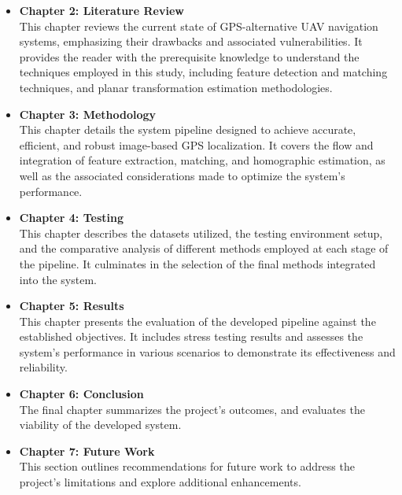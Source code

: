 \begin{itemize}
    \item \textbf{Chapter 2: Literature Review} \\
    This chapter reviews the current state of GPS-alternative UAV navigation systems, emphasizing their drawbacks and associated vulnerabilities. It provides the reader with the prerequisite knowledge to understand the techniques employed in this study, including feature detection and matching techniques, and planar transformation estimation methodologies. 
    
    \item \textbf{Chapter 3: Methodology} \\
    This chapter details the system pipeline designed to achieve accurate, efficient, and robust image-based GPS localization. It covers the flow and integration of feature extraction, matching, and homographic estimation, as well as the associated considerations made to optimize the system's performance.
    
    \item \textbf{Chapter 4: Testing} \\
    This chapter describes the datasets utilized, the testing environment setup, and the comparative analysis of different methods employed at each stage of the pipeline. It culminates in the selection of the final methods integrated into the system.
    
    \item \textbf{Chapter 5: Results} \\
    This chapter presents the evaluation of the developed pipeline against the established objectives. It includes stress testing results and assesses the system's performance in various scenarios to demonstrate its effectiveness and reliability.
    
    \item \textbf{Chapter 6: Conclusion} \\
    The final chapter summarizes the project's outcomes, and evaluates the viability of the developed system.
    
    \item \textbf{Chapter 7: Future Work} \\
    This section outlines recommendations for future work to address the project's limitations and explore additional enhancements.
\end{itemize}














